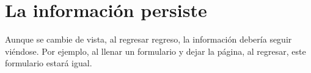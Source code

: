 




\section{La información persiste}

Aunque se cambie de vista, al regresar regreso, la información debería seguir viéndose. Por ejemplo, al llenar un formulario  y dejar la página, al regresar, este formulario estará igual.


%


